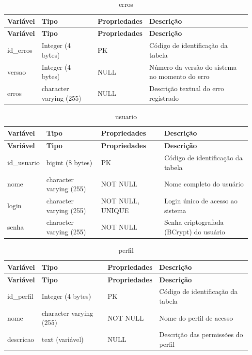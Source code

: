 \Needspace{0.32\textheight}
\begin{longtable}{|L{5.2cm}|L{3.2cm}|L{2.4cm}|L{3.4cm}|}
\caption{erros} \\
\hline
\textbf{Variável} & \textbf{Tipo} & \textbf{Propriedades} & \textbf{Descrição} \\
\hline
\endfirsthead
\hline
\textbf{Variável} & \textbf{Tipo} & \textbf{Propriedades} & \textbf{Descrição} \\
\hline
\endhead
id\_erros & Integer (4 bytes) & PK & Código de identificação da tabela \\
\hline
versao & Integer (4 bytes) & NULL & Número da versão do sistema no momento do erro \\
\hline
erros & character varying (255) & NULL & Descrição textual do erro registrado \\
\hline
\end{longtable}

\fonteautores

\vspace{\baselineskip}

\Needspace{0.32\textheight}
\begin{longtable}{|L{5.2cm}|L{3.2cm}|L{2.4cm}|L{3.4cm}|}
\caption{usuario} \\
\hline
\textbf{Variável} & \textbf{Tipo} & \textbf{Propriedades} & \textbf{Descrição} \\
\hline
\endfirsthead
\hline
\textbf{Variável} & \textbf{Tipo} & \textbf{Propriedades} & \textbf{Descrição} \\
\hline
\endhead
id\_usuario & bigint (8 bytes) & PK & Código de identificação da tabela \\
\hline
nome & character varying (255) & NOT NULL & Nome completo do usuário \\
\hline
login & character varying (255) & NOT NULL, UNIQUE & Login único de acesso ao sistema \\
\hline
senha & character varying (255) & NOT NULL & Senha criptografada (BCrypt) do usuário \\
\hline
\end{longtable}

\fonteautores

\vspace{\baselineskip}

\Needspace{0.32\textheight}
\begin{longtable}{|L{5.2cm}|L{3.2cm}|L{2.4cm}|L{3.4cm}|}
\caption{perfil} \\
\hline
\textbf{Variável} & \textbf{Tipo} & \textbf{Propriedades} & \textbf{Descrição} \\
\hline
\endfirsthead
\hline
\textbf{Variável} & \textbf{Tipo} & \textbf{Propriedades} & \textbf{Descrição} \\
\hline
\endhead
id\_perfil & Integer (4 bytes) & PK & Código de identificação da tabela \\
\hline
nome & character varying (255) & NOT NULL & Nome do perfil de acesso \\
\hline
descricao & text (variável) & NULL & Descrição das permissões do perfil \\
\hline
\end{longtable}

